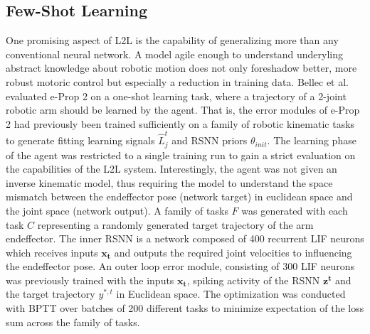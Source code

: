 \documentclass[letterpaper, 10 pt, conference]{ieeeconf}  %
\begin{document}
\subsection{Few-Shot Learning}

One promising aspect of L2L is the capability of generalizing more than any conventional neural network. A model agile enough to understand
underyling abstract knowledge about robotic motion does not only foreshadow better, more robust motoric control but especially a reduction in 
training data. Bellec et al.\cite{bellecBiologicallyInspiredAlternatives2019} evaluated e-Prop 2 on a one-shot 
learning task, where a trajectory of a 2-joint robotic arm should be learned by 
the agent. That is, the error modules of e-Prop 2 had previously been trained sufficiently on a family of robotic kinematic tasks to generate
fitting learning signals $\hat{L}^t_j$ and RSNN priors $\theta_{init}$. The learning phase of the agent was restricted to a single training run 
to gain a strict evaluation on the capabilities of the L2L system. Interestingly, the agent was not given an inverse kinematic model, thus 
requiring the model to understand the space mismatch between the endeffector pose (network target) in euclidean space and the joint space 
(network output). A family of tasks $F$ was generated with each task $C$ representing a randomly generated target trajectory of the arm endeffector. 
The inner RSNN is a network composed of 400 recurrent LIF neurons which receives inputs $\mathbf{x_t}$ and outputs the required joint velocities 
to influencing the endeffector pose. 
An outer loop error module, consisting of 300 LIF neurons was previously trained with the inputs $\mathbf{x_t}$, spiking activity of the RSNN 
$\mathbf{z^t}$ and the target trajectory $y^{*,t}$ in Euclidean space. The optimization was conducted with BPTT over batches of 
200 different tasks to minimize expectation of the loss sum across the family of tasks. 
\end{document}
